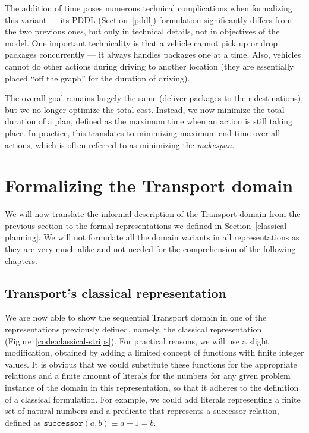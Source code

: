 The addition of time poses numerous technical complications when formalizing this variant
--- its PDDL (Section~\ref{pddl}) formulation significantly differs from the two previous ones, but only in technical details, not in objectives of the model.
One important technicality is that a vehicle cannot pick up or drop packages concurrently --- it always handles packages one at a time. Also, vehicles cannot do other actions during driving to another location (they are essentially placed ``off the graph'' for the duration of driving).

The overall goal remains largely the same (deliver packages to their destinations), but we no longer optimize the total cost. Instead, we now minimize the total duration of a plan,
defined as the maximum time when an action is still taking place.
In practice, this translates to minimizing maximum end time over all actions, which is often referred to as minimizing the \textit{makespan}.



















\section{Formalizing the Transport domain}

We will now translate the informal description of the Transport domain from the previous section to the formal representations we defined in Section~\ref{classical-planning}. We will not formulate all the domain variants in all representations as
they are very much alike and not needed for the comprehension of the following chapters.

\subsection{Transport's classical representation}\label{transport-classical-representation}

We are now able to show the sequential Transport domain in one of the representations
previously defined, namely,
the classical representation (Figure~\ref{code:classical-strips}).
For practical reasons, we will use a slight modification, obtained by adding a limited concept of functions
with finite integer values.
It is obvious that we could substitute these functions for the appropriate relations
and a finite amount of literals for the numbers for any given problem instance of
the domain in this representation,
so that it adheres to the definition of a classical formulation.
For example, we could add literals representing a finite set of
natural numbers and a predicate that represents
a successor relation, defined as $\texttt{successor}(a, b) \equiv a + 1 = b$.

